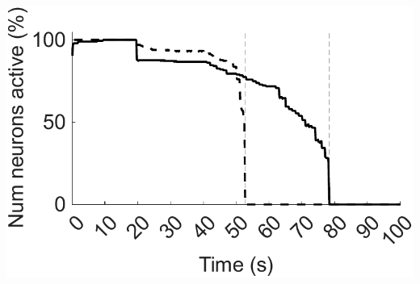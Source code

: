 \documentclass[utf8]{FrontiersinHarvard} %
\begin{document}
\begin{subfigure}
\begin{minipage}[b]{0.32\textwidth}
        \includegraphics[width=\linewidth]{AD/Hz_sum}
        \caption{}
        \label{figs:results:AD:Hz_sums}
    \end{minipage}%
\setcounter{figure}{4}
\setcounter{subfigure}{-1}
    \caption{Typical network dynamics with and without resource pool replenishment while removing connections. \textbf{(A)} Input is provided for the first \SI{20}{\second}. Synapses are progressively deleted from \SI{40}{\second} on (red). {\textbf{(B)}} Progressive synaptic loss. {\textbf{(C)}} Firing rates of the network's neurons with replenishment of the resource pool. {\textbf{(D)}} Left axis: example of \SI{100}{} synapses' weights with resource pool replenishment. Right axis/dashed line: mean of nonfilopodia synapses' weights. {\textbf{(E)}} Resource pools, $p$, with replenishment of the resource pool. {\textbf{(F)}} Firing rates of the network's neurons without replenishment of the resource pool. {\textbf{(G)}} Left axis: example of \SI{100}{} synapses' weights without replenishment of the resource pool. Right axis/dashed line: mean of nonfilopodia synapses' weights. {\textbf{(H)}} Sum of weights as a percentage of the maximum sum of weights. Solid line, with resource replenishment; dashed line, without resource replenishment. {\textbf{(I)}} The number of active neurons as a percentage of the maximum number of active neurons. Solid line: with resource replenishment; Dashed line: without resource replenishment. {\textbf{(B)}}, {\textbf{(H)}}, and {\textbf{(I)}} Vertical lines are when all neurons stopped firing either with or without resource replenishment. {\textbf{(D)}} and {\textbf{(G)}} Weights are shown while they exist and the mean of nonfilopodia synapses' weights is shown while neurons are active.}
    \label{figs:results:AD}
\end{subfigure}

\end{document}
